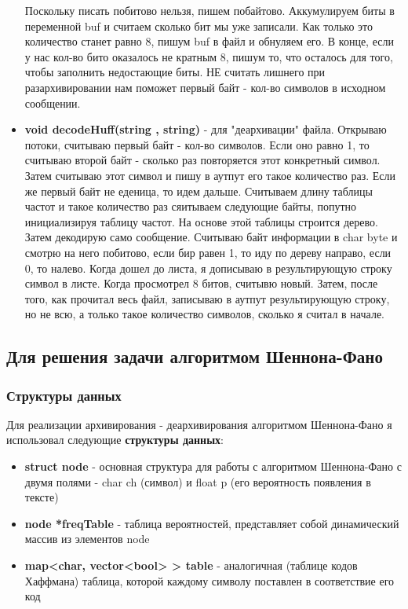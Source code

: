 \documentclass[a4paper, 12pt]{article}
\begin{document}
\begin{itemize}
  Поскольку писать побитово нельзя, пишем побайтово. Аккумулируем биты в переменной
  buf и считаем сколько бит мы уже записали.
  Как только это количество станет равно 8, пишум buf в файл и обнуляем его.
  В конце, если у нас кол-во бито оказалось не кратным 8,
  пишум то, что осталось для того, чтобы заполнить недостающие биты.
  НЕ считать лишнего при разархивировании нам поможет первый байт -
  кол-во символов в исходном сообщении.
  \item \textbf{void decodeHuff(string , string)} - для "деархивации" файла.
  Открываю потоки, считываю первый байт - кол-во символов. Если оно равно
  1, то считываю второй байт - сколько раз повторяется этот конкретный символ.
  Затем считываю этот символ и пишу в аутпут его такое
  количество раз. Если же первый байт не еденица, то идем дальше. Считываем
  длину таблицы частот и такое количество раз сяитываем
  следующие байты, попутно инициализируя таблицу частот. На основе этой таблицы
  строится дерево. Затем декодирую само сообщение.
  Считываю байт информации в char byte и смотрю на него побитово, если бир равен
  1, то иду по дереву направо, если 0, то налево.
  Когда дошел до листа, я дописываю в результирующую строку символ в листе.
  Когда просмотрел 8 битов, считывю новый.
  Затем, после того, как прочитал весь файл, записываю в аутпут результирующую
  строку, но не всю, а только такое количество символов,
  сколько я считал в начале.
\end{itemize}

\subsection{Для решения задачи алгоритмом Шеннона-Фано}
\subsubsection{Структуры данных}
Для реализации архивирования - деархивирования алгоритмом Шеннона-Фано я использовал
следующие \textbf{структуры данных}:
\begin{itemize}
  \item \textbf{struct node} - основная структура для работы с алгоритмом
  Шеннона-Фано с двумя полями - char ch (символ) и float p (его
  вероятность появления в тексте)
  \item \textbf{node *freqTable} - таблица вероятностей, представляет собой
  динамический массив из элементов node
  \item \textbf{map<char, vector<bool> > table} - аналогичная (таблице кодов Хаффмана)
  таблица, которой каждому символу
  поставлен в соответствие его код
\end{itemize}
\end{document}
